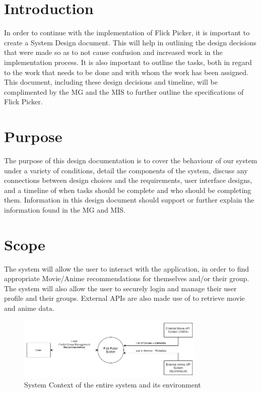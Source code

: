 \documentclass[12pt, titlepage]{article}
\begin{document}
\newpage

\tableofcontents

\newpage

\listoftables

\listoffigures

\newpage


\section{Introduction}
\hspace*{14pt} In order to continue with the implementation of Flick Picker, it is important to create a System Design document. This will help in outlining the design decisions that were made so as to not cause confusion and increased work in the implementation process. It is also important to outline the tasks, both in regard to the work that needs to be done and with whom the work has been assigned. This document, including these design decisions and timeline, will be complimented by the MG and the MIS to further outline the specifications of Flick Picker. 

\section{Purpose}
\hspace*{14pt} The purpose of this design documentation is to cover the behaviour of our system under a variety of conditions, detail the components of the system, discuss any connections between design choices and the requirements, user interface designs, and a timeline of when tasks should be complete and who should be completing them. Information in this design document should support or further explain the information found in the MG and MIS.

\section{Scope}

The system will allow the user to interact with the application, in order to find appropriate Movie/Anime recommendations for themselves and/or their group. The system will also allow the user to securely login and manage their user profile and their groups. External APIs are also made use of to retrieve movie and anime data.

\begin{figure}[H]
	\centering
	\includegraphics[width=0.8\textwidth]{SystemContext.png}
	\caption{System Context of the entire system and its environment}
	\label{FigUH}
\end{figure}
\end{document}
